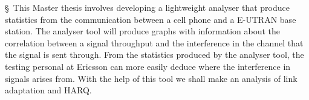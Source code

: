 \documentclass [cropmarks, frame, english, master]{idaexhibitpage}
\author {Paul Nedstrand \& Razmus Lindgren}
\begin{document}
\exhibitpagebeforeabstract 
 \S  \ This Master thesis involves developing a lightweight analyser that produce statistics from the communication between a cell phone and a E-UTRAN base station. The analyser tool will produce graphs with information about the correlation between a signal throughput and the interference in the channel that the signal is sent through. From the statistics produced by the analyser tool, the testing personal at Ericsson can more easily deduce where the interference in signals arises from. With the help of this tool we shall make an analysis of link adaptation and HARQ. 
\exhibitpageafterabstract 
\end{document}
